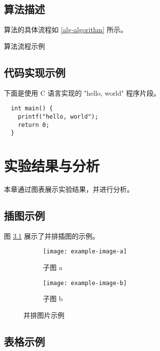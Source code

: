 \documentclass{sysuthesis}
\begin{document}
\section{算法描述}

算法的具体流程如 \autoref{alg-algorithm} 所示。

\begin{algorithm}[H]
  \caption{算法流程示例}
  \label{alg-algorithm}
\end{algorithm}

\section{代码实现示例}

下面是使用 C 语言实现的 "hello, world" 程序片段。

\begin{verbatim}
  int main() {
    printf("hello, world");
    return 0;
  }
\end{verbatim}

\chapter{实验结果与分析}

本章通过图表展示实验结果，并进行分析。

\section{插图示例}

图 \ref{fig-1} 展示了并排插图的示例。

\begin{figure}[H]
  \centering
  \begin{subfigure}{0.45\linewidth}
    \texttt{[image: example-image-a]}
    \caption{子图 a}
  \end{subfigure}
  \hfil
  \begin{subfigure}{0.45\linewidth}
    \texttt{[image: example-image-b]}
    \caption{子图 b}
  \end{subfigure}
  \caption{并排图片示例}\label{fig-1}
\end{figure}

\section{表格示例}
\end{document}
